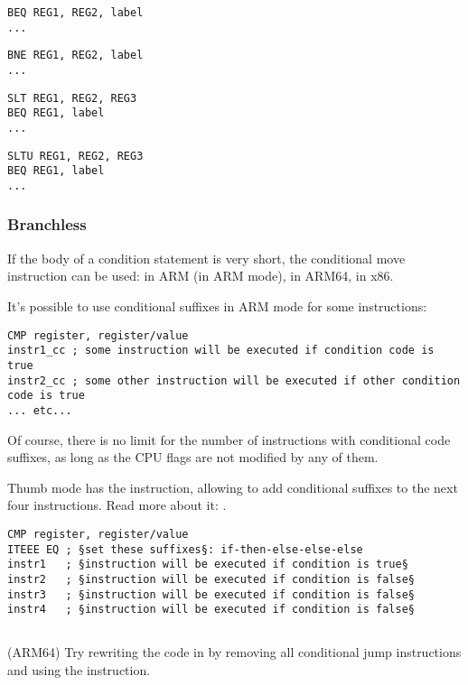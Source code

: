 \begin{lstlisting}[caption=Check for equal values]
BEQ REG1, REG2, label
...
\end{lstlisting}

\begin{lstlisting}[caption=Check for non-equal values]
BNE REG1, REG2, label
...
\end{lstlisting}

\begin{lstlisting}[caption=Check for less than{,} greater than (signed)]
SLT REG1, REG2, REG3
BEQ REG1, label
...
\end{lstlisting}

\begin{lstlisting}[caption=Check for less than{,} greater than (unsigned)]
SLTU REG1, REG2, REG3
BEQ REG1, label
...
\end{lstlisting}

\subsubsection{Branchless}

If the body of a condition statement is very short, the conditional move instruction can be used: 
 in ARM (in ARM mode),  in ARM64,  in x86.


It's possible to use conditional suffixes in ARM mode for some instructions:

\begin{lstlisting}[caption=ARM (\ARMMode)]
CMP register, register/value
instr1_cc ; some instruction will be executed if condition code is true
instr2_cc ; some other instruction will be executed if other condition code is true
... etc...
\end{lstlisting}

Of course, there is no limit for the number of instructions with conditional code suffixes, 
as long as the CPU flags are not modified by any of them.


Thumb mode has the  instruction, allowing to add conditional suffixes to the next four instructions.
Read more about it: .

\begin{lstlisting}[caption=ARM (\ThumbMode)]
CMP register, register/value
ITEEE EQ ; §set these suffixes§: if-then-else-else-else
instr1   ; §instruction will be executed if condition is true§
instr2   ; §instruction will be executed if condition is false§
instr3   ; §instruction will be executed if condition is false§
instr4   ; §instruction will be executed if condition is false§
\end{lstlisting}

\subsection{\Exercise}

(ARM64) Try rewriting the code in  by removing all 
conditional jump instructions and using the  instruction.

